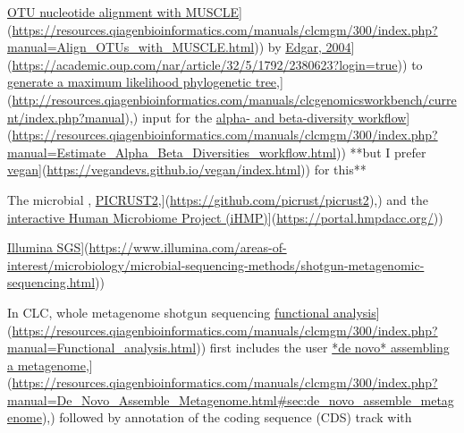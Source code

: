 \documentclass[
]{book}
\begin{document}
\href{\%5Bhttps://resources.qiagenbioinformatics.com/manuals/clcmgm/300/index.php?manual=Align_OTUs_with_MUSCLE.html}{OTU nucleotide alignment with MUSCLE}{]}(\url{https://resources.qiagenbioinformatics.com/manuals/clcmgm/300/index.php?manual=Align_OTUs_with_MUSCLE.html})) by \href{\%5Bhttps://academic.oup.com/nar/article/32/5/1792/2380623?login=true}{Edgar, 2004}{]}(\url{https://academic.oup.com/nar/article/32/5/1792/2380623?login=true})) to \href{\%5Bhttp://resources.qiagenbioinformatics.com/manuals/clcgenomicsworkbench/current/index.php?manual}{generate a maximum likelihood phylogenetic tree},{]}(\url{http://resources.qiagenbioinformatics.com/manuals/clcgenomicsworkbench/current/index.php?manual}),) input for the \href{\%5Bhttps://resources.qiagenbioinformatics.com/manuals/clcmgm/300/index.php?manual=Estimate_Alpha_Beta_Diversities_workflow.html}{alpha- and beta-diversity workflow}{]}(\url{https://resources.qiagenbioinformatics.com/manuals/clcmgm/300/index.php?manual=Estimate_Alpha_Beta_Diversities_workflow.html})) **but I prefer \href{\%5Bhttps://vegandevs.github.io/vegan/index.html}{vegan}{]}(\url{https://vegandevs.github.io/vegan/index.html})) for this**

The microbial , \href{\%5Bhttps://github.com/picrust/picrust2}{PICRUST2},{]}(\url{https://github.com/picrust/picrust2}),) and the \href{\%5Bhttps://portal.hmpdacc.org/}{interactive Human Microbiome Project (iHMP)}{]}(\url{https://portal.hmpdacc.org/}))

\href{\%5Bhttps://www.illumina.com/areas-of-interest/microbiology/microbial-sequencing-methods/shotgun-metagenomic-sequencing.html}{Illumina SGS}{]}(\url{https://www.illumina.com/areas-of-interest/microbiology/microbial-sequencing-methods/shotgun-metagenomic-sequencing.html}))

In CLC, whole metagenome shotgun sequencing \href{\%5Bhttps://resources.qiagenbioinformatics.com/manuals/clcmgm/300/index.php?manual=Functional_analysis.html}{functional analysis}{]}(\url{https://resources.qiagenbioinformatics.com/manuals/clcmgm/300/index.php?manual=Functional_analysis.html})) first includes the user \href{\%5Bhttps://resources.qiagenbioinformatics.com/manuals/clcmgm/300/index.php?manual=De_Novo_Assemble_Metagenome.html\#sec:de_novo_assemble_metagenome}{*de novo* assembling a metagenome},{]}(\url{https://resources.qiagenbioinformatics.com/manuals/clcmgm/300/index.php?manual=De_Novo_Assemble_Metagenome.html\#sec:de_novo_assemble_metagenome}),) followed by annotation of the coding sequence (CDS) track with
\end{document}

